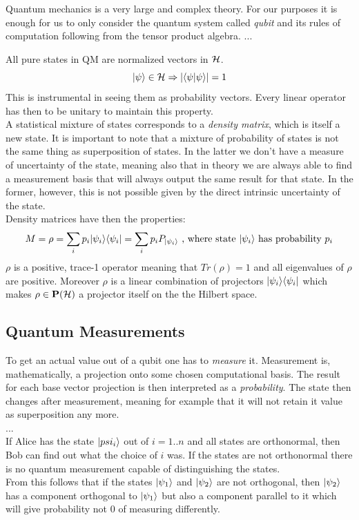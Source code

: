 	Quantum mechanics is a very large and complex theory. For our purposes it is enough for us to only consider the quantum system called \emph{qubit} and its rules of computation following from the tensor product algebra.  ...
	
	All pure states in QM are normalized vectors in $\mathcal{H}$.
	$$ |\psi \rangle\in\mathcal{H} \Rightarrow  \vert\langle\psi|\psi\rangle\vert = 1$$
	This is instrumental in seeing them as probability vectors. Every linear operator has then to be unitary to maintain this property.\\
	A statistical mixture of states corresponds to a \emph{density matrix}, which is itself a new state. It is important to note that a mixture of probability of states is not the same thing as superposition of states. In the latter we don't have a measure of uncertainty of the state, meaning also that in theory we are always able to find a measurement basis that will always output the same result for that state. In the former, however, this is not possible given by the direct intrinsic uncertainty of the state.\\
	Density matrices have then the properties:
	$$ M = \rho = \sum_i p_i |\psi_i \rangle\langle \psi_i| = \sum_i p_i P_{|\psi_i \rangle} \text{  , where state }|\psi_i \rangle\text{ has probability } p_i $$ 
	$\rho$ is a positive, trace-1 operator meaning that $Tr(\rho) = 1$ and all eigenvalues of $\rho$ are positive. Moreover $\rho$ is a linear combination of projectors $|\psi_i\rangle\langle \psi_i|$ which makes $\rho\in\mathbf{P}(\mathcal{H})$ a projector itself on the the Hilbert space.
	
		\subsection{Quantum Measurements}
		To get an actual value out of a qubit one has to \textit{measure} it. Measurement is, mathematically, a projection onto some chosen computational basis. The result for each base vector projection is then interpreted as a \emph{probability}. The state then changes after measurement, meaning for example that it will not retain it value as superposition any more.\\
		...\\
		
		If Alice has the state $|psi_i \rangle$ out of $i=1..n$ and all states are orthonormal, then Bob can find out what the choice of $i$ was.
		If the states are not orthonormal there is no quantum measurement capable of distinguishing the states. \\
		From this follows that if the states $|\psi_1 \rangle$ and $|\psi_2 \rangle$ are not orthogonal, then $|\psi_2 \rangle$ has a component orthogonal to $|\psi_1 \rangle$ but also a component parallel to it which will give probability not $0$ of measuring differently.
		
